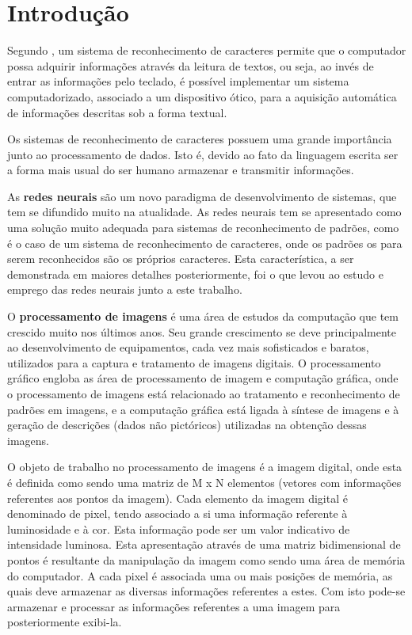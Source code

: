 \section{Introdução}
	Segundo \cite{osorio1991estudo}, um sistema de reconhecimento de caracteres permite que o computador possa adquirir informações através da leitura de textos, ou seja, ao invés de entrar as informações pelo teclado, é possível implementar um sistema computadorizado, associado a um dispositivo ótico, para a aquisição automática de informações descritas sob a forma textual.
	
	Os sistemas de reconhecimento de caracteres possuem uma grande importância junto ao processamento de dados. Isto é, devido ao fato da linguagem escrita ser a forma mais usual do ser humano armazenar e transmitir informações.
	
	As \textbf{redes neurais} são um novo paradigma de desenvolvimento de sistemas, que tem se difundido muito na atualidade. As redes neurais tem se apresentado como uma solução muito adequada para sistemas de reconhecimento de padrões, como é o caso de um sistema de reconhecimento de caracteres, onde os padrões os para serem reconhecidos são os próprios caracteres. Esta característica, a ser demonstrada em maiores detalhes posteriormente, foi o que levou ao estudo e emprego das redes neurais junto a este trabalho.
	
	O \textbf{processamento de imagens} é uma área de estudos da computação que tem crescido muito nos últimos anos. Seu grande crescimento se deve principalmente ao desenvolvimento de equipamentos, cada vez mais sofisticados e baratos, utilizados para a captura e tratamento de imagens digitais. O processamento gráfico engloba as área de processamento de imagem e computação gráfica, onde o processamento de imagens está relacionado ao tratamento e reconhecimento de padrões em imagens, e a computação gráfica está ligada à síntese de imagens e à geração de descrições (dados não pictóricos) utilizadas na obtenção dessas imagens.
	
	O objeto de trabalho no processamento de imagens é a imagem digital, onde esta é definida como sendo uma matriz de M x N elementos (vetores com informações referentes aos pontos da imagem). Cada elemento da imagem digital é denominado de pixel, tendo associado a si uma informação referente à luminosidade e à cor. Esta informação pode ser um valor indicativo de intensidade luminosa. Esta apresentação através de uma matriz bidimensional de pontos é resultante da manipulação da imagem como sendo uma área de memória do computador. A cada pixel é associada uma ou mais posições de memória, as quais deve armazenar as diversas informações referentes a estes. Com isto pode-se armazenar e processar as informações referentes a uma imagem para posteriormente exibi-la.
	

